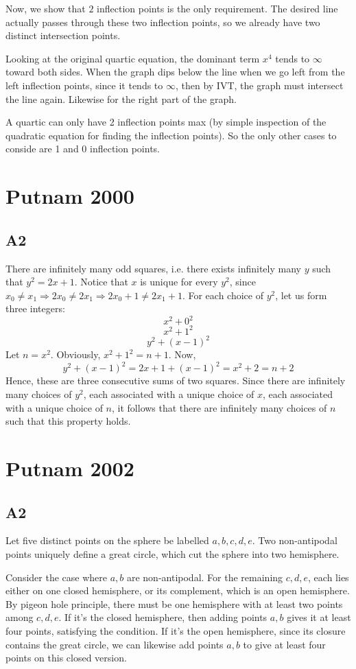 \documentclass{book}
\begin{document}
Now, we show that $2$ inflection points is the only requirement. The desired line actually passes through these two inflection points, so we already have two distinct intersection points.

Looking at the original quartic equation, the dominant term $x^4$ tends to $\infty$ toward both sides. When the graph dips below the line when we go left from the left inflection points, since it tends to $\infty$, then by IVT, the graph must intersect the line again. Likewise for the right part of the graph.

A quartic can only have 2 inflection points max (by simple inspection of the quadratic equation for finding the inflection points). So the only other cases to conside are 1 and 0 inflection points.

\chapter{Putnam 2000}

\section*{A2}
There are infinitely many odd squares, i.e. there exists infinitely many $y$ such that $y^2 = 2x + 1$. Notice that $x$ is unique for every $y^2$, since $x_0 \neq x_1 \Rightarrow 2x_0 \neq 2x_1 \Rightarrow 2x_0 + 1 \neq 2x_1 + 1$. For each choice of $y^2$, let us form three integers:
$$x^2 + 0^2$$
$$x^2 + 1^2$$
$$y^2 + (x - 1)^2$$
Let $n = x^2$. Obviously, $x^2 + 1^2 = n + 1$. Now,
$$y^2 + (x - 1)^2 = 2x + 1 + (x - 1)^2 = x^2 + 2 = n + 2$$
Hence, these are three consecutive sums of two squares. Since there are infinitely many choices of $y^2$, each associated with a unique choice of $x$, each associated with a unique choice of $n$, it follows that there are infinitely many choices of $n$ such that this property holds.

\chapter{Putnam 2002}

\section*{A2}
Let five distinct points on the sphere be labelled $a, b, c, d, e$. Two non-antipodal points uniquely define a great circle, which cut the sphere into two hemisphere.

Consider the case where $a, b$ are non-antipodal. For the remaining $c, d, e$, each lies either on one closed hemisphere, or its complement, which is an open hemisphere. By pigeon hole principle, there must be one hemisphere with at least two points among $c, d, e$. If it's the closed hemisphere, then adding points $a, b$ gives it at least four points, satisfying the condition. If it's the open hemisphere, since its closure contains the great circle, we can likewise add points $a, b$ to give at least four points on this closed version.
\end{document}
